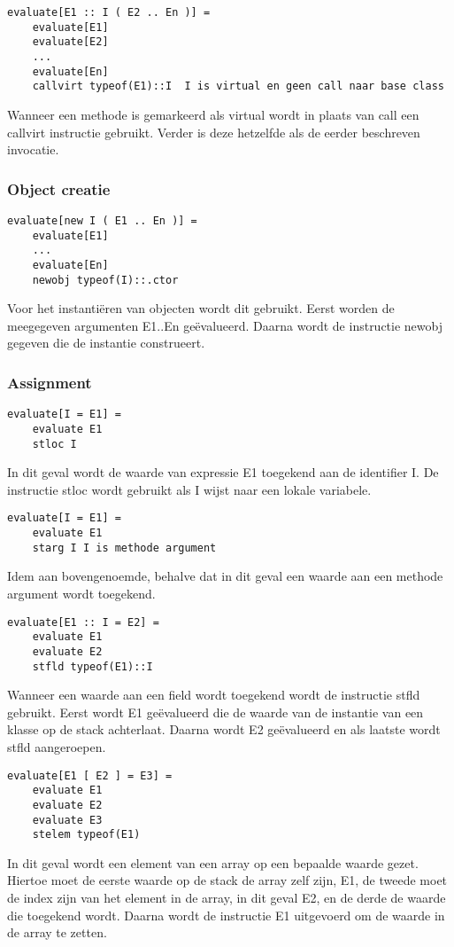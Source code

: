 \begin{lstlisting}
evaluate[E1 :: I ( E2 .. En )] =
	evaluate[E1]
	evaluate[E2]
	...
	evaluate[En]
	callvirt typeof(E1)::I	I is virtual en geen call naar base class
\end{lstlisting}
Wanneer een methode is gemarkeerd als virtual wordt in plaats van call een callvirt instructie gebruikt. Verder is deze hetzelfde als de eerder beschreven invocatie.

\subsubsection{Object creatie}
\begin{lstlisting}
evaluate[new I ( E1 .. En )] =
	evaluate[E1]
	...
	evaluate[En]
	newobj typeof(I)::.ctor
\end{lstlisting}
Voor het instanti\"eren van objecten wordt dit gebruikt. Eerst worden de meegegeven argumenten E1..En ge\"evalueerd. Daarna wordt de instructie newobj gegeven die de instantie construeert.

\subsubsection{Assignment}
\begin{lstlisting}
evaluate[I = E1] =
	evaluate E1
	stloc I
\end{lstlisting}
In dit geval wordt de waarde van expressie E1 toegekend aan de identifier I. De instructie stloc wordt gebruikt als I wijst naar een lokale variabele.

\begin{lstlisting}
evaluate[I = E1] =
	evaluate E1
	starg I	I is methode argument
\end{lstlisting}
Idem aan bovengenoemde, behalve dat in dit geval een waarde aan een methode argument wordt toegekend.

\begin{lstlisting}
evaluate[E1 :: I = E2] =
	evaluate E1
	evaluate E2
	stfld typeof(E1)::I
\end{lstlisting}
Wanneer een waarde aan een field wordt toegekend wordt de instructie stfld gebruikt. Eerst wordt E1 ge\"evalueerd die de waarde van de instantie van een klasse op de stack achterlaat. Daarna wordt E2 ge\"evalueerd en als laatste wordt stfld aangeroepen.

\begin{lstlisting}
evaluate[E1 [ E2 ] = E3] =
	evaluate E1
	evaluate E2
	evaluate E3
	stelem typeof(E1)
\end{lstlisting}
In dit geval wordt een element van een array op een bepaalde waarde gezet. Hiertoe moet de eerste waarde op de stack de array zelf zijn, E1, de tweede moet de index zijn van het element in de array, in dit geval E2, en de derde de waarde die toegekend wordt. Daarna wordt de instructie E1 uitgevoerd om de waarde in de array te zetten.

